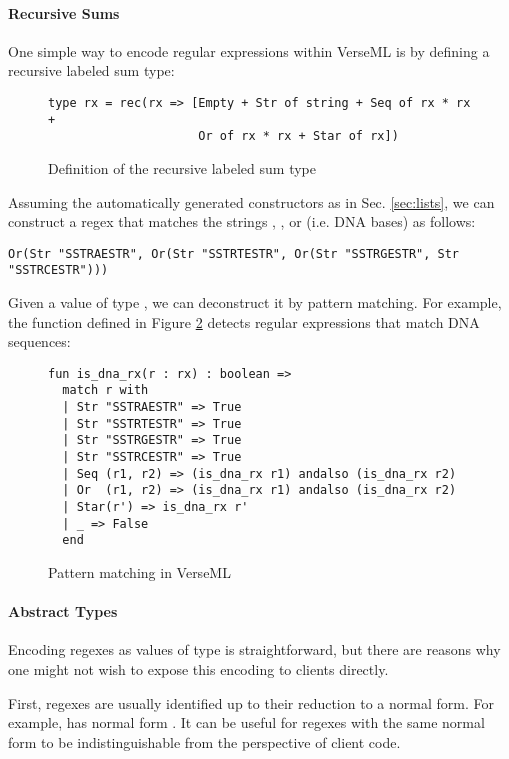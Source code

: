 \paragraph{Recursive Sums}
One simple way to encode regular expressions within VerseML is by defining a recursive labeled sum type:

\begin{figure}[ht]
\begin{lstlisting}[numbers=none]
type rx = rec(rx => [Empty + Str of string + Seq of rx * rx +
                     Or of rx * rx + Star of rx])
\end{lstlisting}
\caption{Definition of the recursive labeled sum type }
\label{fig:datatype-rx}
\end{figure}
Assuming the automatically generated constructors as in Sec. \ref{sec:lists}, we can construct a regex that matches the strings , ,  or  (i.e. DNA bases) as follows:
\begin{lstlisting}[numbers=none]
Or(Str "SSTRAESTR", Or(Str "SSTRTESTR", Or(Str "SSTRGESTR", Str "SSTRCESTR")))
\end{lstlisting}

Given a value of type , we can deconstruct it by pattern matching. For example, the function  defined in Figure \ref{fig:is_dna_rx} detects regular expressions that match DNA sequences:

\begin{figure}
\begin{lstlisting}[numbers=none]
fun is_dna_rx(r : rx) : boolean => 
  match r with 
  | Str "SSTRAESTR" => True
  | Str "SSTRTESTR" => True
  | Str "SSTRGESTR" => True
  | Str "SSTRCESTR" => True
  | Seq (r1, r2) => (is_dna_rx r1) andalso (is_dna_rx r2)
  | Or  (r1, r2) => (is_dna_rx r1) andalso (is_dna_rx r2)
  | Star(r') => is_dna_rx r'
  | _ => False 
  end
\end{lstlisting}
\caption{Pattern matching in VerseML}
\label{fig:is_dna_rx}
\end{figure}


\paragraph{Abstract Types} Encoding regexes as values of type  is straightforward, but there are reasons why one might not wish to expose this encoding to clients directly. 

First, regexes are usually identified up to their reduction to a normal form. For example,  has normal form . It can be useful for regexes with the same normal form to be  indistinguishable from the perspective of client code. 

